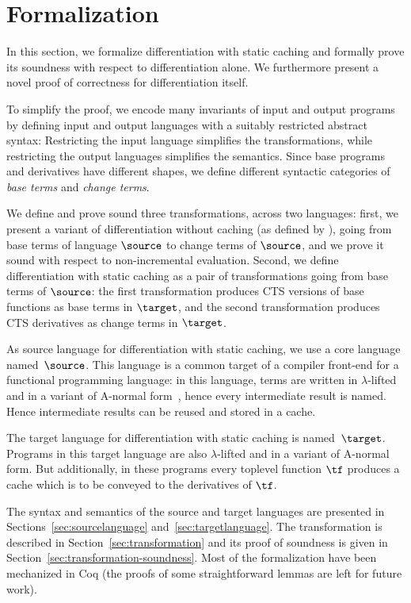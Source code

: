 \section{Formalization}
\label{sec:formalization}
In this section, we formalize differentiation with static caching and formally
prove its soundness with respect to differentiation alone. We furthermore
present a novel proof of correctness for differentiation itself.

To simplify the proof, we encode many invariants of input and output programs by
defining input and output languages with a suitably restricted abstract syntax:
Restricting the input language simplifies the transformations, while restricting
the output languages simplifies the semantics. Since base programs and
derivatives have different shapes, we define different syntactic categories of
\emph{base terms} and \emph{change terms}.

We define and prove sound three transformations, across two languages: first, we
present a variant of differentiation without caching (as defined by
\citet{CaiEtAl2014ILC}), going from base terms of language $\source$ to change
terms of $\source$, and we prove it sound with respect to non-incremental
evaluation.
%
Second, we define differentiation with static caching as a pair of
transformations going from base terms of $\source$: the first transformation
produces CTS versions of base functions as base terms in $\target$,
and the second transformation produces CTS derivatives as change terms
in $\target$.

As source language for differentiation with static caching,
we use a core language named~$\source$.  This
language is a common target of a compiler front-end for a functional
programming language: in this language, terms are written in
$\lambda$-lifted and in a variant of A-normal form~\cite{sabry1993reasoning}, hence every
intermediate result is named. Hence intermediate results can be reused
and stored in a cache.

The target language for differentiation with static caching is
named~$\target$. Programs in this target language are also
$\lambda$-lifted and in a variant of A-normal form. But additionally, in these
programs every toplevel function $\tf$ produces a cache which is to be
conveyed to the derivatives of $\tf$.

The syntax and semantics of the source and target languages are
presented in Sections~\ref{sec:sourcelanguage}
and~\ref{sec:targetlanguage}. The transformation is described in
Section~\ref{sec:transformation} and its proof of soundness
is given in Section~\ref{sec:transformation-soundness}. Most of
the formalization have been mechanized in Coq (the proofs of some
straightforward lemmas are left for future work).







